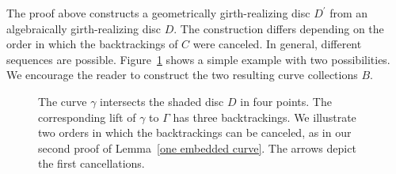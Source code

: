 The proof above constructs a geometrically girth-realizing disc $D^{\prime}$ from an algebraically girth-realizing disc $D$.  The construction differs depending on the order in which the backtrackings of $C$ were canceled.  In general, different sequences are possible.  Figure~\ref{parenthesize} shows a simple example with two possibilities.  We encourage the reader to construct the two resulting curve collections $B$.

\begin{figure}
\caption{
The curve $\gamma$ intersects the shaded disc $D$ in four points.  The corresponding lift of $\gamma$ to $\Gamma$ has three backtrackings.  We illustrate two orders in which the backtrackings can be canceled, as in our second proof of Lemma~\ref{one embedded curve}.  The arrows depict the first cancellations.}
\label{parenthesize}
\end{figure}
